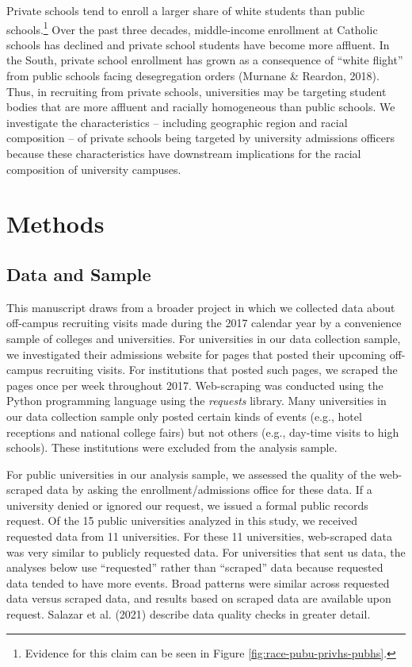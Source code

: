 \documentclass[
  12pt,
]{article}
\begin{document}
Private schools tend to enroll a larger share of white students than public schools.\footnote{Evidence for this claim can be seen in Figure \ref{fig:race-pubu-privhs-pubhs}.} Over the past three decades, middle-income enrollment at Catholic schools has declined and private school students have become more affluent. In the South, private school enrollment has grown as a consequence of ``white flight'' from public schools facing desegregation orders (Murnane \& Reardon, 2018). Thus, in recruiting from private schools, universities may be targeting student bodies that are more affluent and racially homogeneous than public schools. We investigate the characteristics -- including geographic region and racial composition -- of private schools being targeted by university admissions officers because these characteristics have downstream implications for the racial composition of university campuses.

\hypertarget{methods}{%
\section{Methods}\label{methods}}

\hypertarget{data-and-sample}{%
\subsection{Data and Sample}\label{data-and-sample}}

This manuscript draws from a broader project in which we collected data about off-campus recruiting visits made during the 2017 calendar year by a convenience sample of colleges and universities. For universities in our data collection sample, we investigated their admissions website for pages that posted their upcoming off-campus recruiting visits. For institutions that posted such pages, we scraped the pages once per week throughout 2017. Web-scraping was conducted using the Python programming language using the \emph{requests} library. Many universities in our data collection sample only posted certain kinds of events (e.g., hotel receptions and national college fairs) but not others (e.g., day-time visits to high schools). These institutions were excluded from the analysis sample.

For public universities in our analysis sample, we assessed the quality of the web-scraped data by asking the enrollment/admissions office for these data. If a university denied or ignored our request, we issued a formal public records request. Of the 15 public universities analyzed in this study, we received requested data from 11 universities. For these 11 universities, web-scraped data was very similar to publicly requested data. For universities that sent us data, the analyses below use ``requested'' rather than ``scraped'' data because requested data tended to have more events. Broad patterns were similar across requested data versus scraped data, and results based on scraped data are available upon request. Salazar et al. (2021) describe data quality checks in greater detail.
\end{document}
